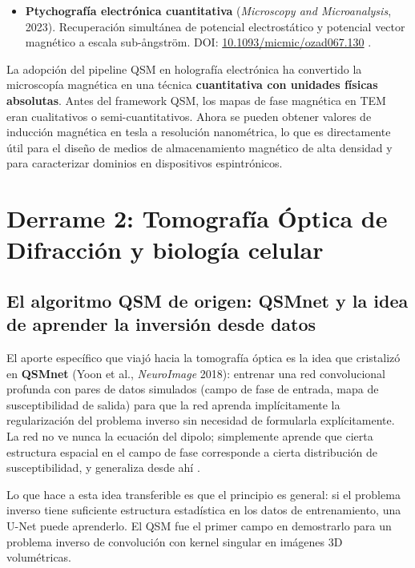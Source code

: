 \documentclass[12pt, a4paper]{article}
\begin{document}
\begin{itemize}[leftmargin=2em, itemsep=5pt]
  \item \textbf{Ptychografía electrónica cuantitativa} (\emph{Microscopy and Microanalysis}, 2023). Recuperación simultánea de potencial electrostático y potencial vector magnético a escala sub-ångström. DOI: \href{https://doi.org/10.1093/micmic/ozad067.130}{10.1093/micmic/ozad067.130} \cite{Ptychography2023}.

\end{itemize}

\begin{novedad}
  La adopción del pipeline QSM en holografía electrónica ha convertido la microscopía magnética en una técnica \textbf{cuantitativa con unidades físicas absolutas}. Antes del framework QSM, los mapas de fase magnética en TEM eran cualitativos o semi-cuantitativos. Ahora se pueden obtener valores de inducción magnética en tesla a resolución nanométrica, lo que es directamente útil para el diseño de medios de almacenamiento magnético de alta densidad y para caracterizar dominios en dispositivos espintrónicos.
\end{novedad}

\section{Derrame 2: Tomografía Óptica de Difracción y biología celular}

\subsection{El algoritmo QSM de origen: QSMnet y la idea de aprender la inversión desde datos}

El aporte específico que viajó hacia la tomografía óptica es la idea que cristalizó en \textbf{QSMnet} (Yoon et al., \emph{NeuroImage} 2018): entrenar una red convolucional profunda con pares de datos simulados (campo de fase de entrada, mapa de susceptibilidad de salida) para que la red aprenda implícitamente la regularización del problema inverso sin necesidad de formularla explícitamente. La red no ve nunca la ecuación del dipolo; simplemente aprende que cierta estructura espacial en el campo de fase corresponde a cierta distribución de susceptibilidad, y generaliza desde ahí \cite{Yoon2018QSMnet}.

Lo que hace a esta idea transferible es que el principio es general: si el problema inverso tiene suficiente estructura estadística en los datos de entrenamiento, una U-Net puede aprenderlo. El QSM fue el primer campo en demostrarlo para un problema inverso de convolución con kernel singular en imágenes 3D volumétricas.
\end{document}
